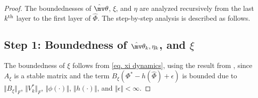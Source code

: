 \documentclass[lettersize,journal]{IEEEtran}
\newcommand*{\wth}{\mv\theta}
\begin{document}
\begin{proof}

The boundednesses of $\hat\wth$, $\xi$, and $\eta$ are analyzed recursively from the last $k\textsuperscript{th}$ layer to the first layer of $\hat\Phi$. The step-by-step analysis is described as follows.

\subsection*{Step 1: Boundedness of $\hat\wth_k,\eta_k$, and $\xi$}


The boundedness of $\xi$ follows from \eqref{eq. xi dynamics}, using the result from \cite[Chap.~4 T.~1.9]{RN13}, since $A_\xi$ is a stable matrix and the term $B_\xi (\Phi^*-h(\hat\Phi)+\epsilon)$ is bounded due to $\Vert B_\xi\Vert_F$, $\Vert V_k^*\Vert_F$, $\Vert \phi(\cdot)\Vert$, $\Vert h(\cdot)\Vert$, and $\Vert\epsilon\Vert <\infty$.



\end{proof}
\end{document}

